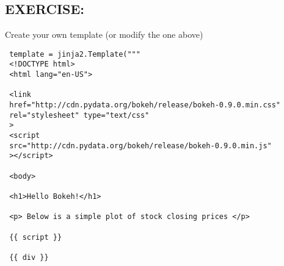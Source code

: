 \documentclass[a4paper,12pt]{article}
\begin{document}
\subsection{EXERCISE: } Create your own template (or modify the one above) 

\begin{framed}
 \begin{verbatim}
 template = jinja2.Template("""
 <!DOCTYPE html>
 <html lang="en-US">
 
 <link
 href="http://cdn.pydata.org/bokeh/release/bokeh-0.9.0.min.css"
 rel="stylesheet" type="text/css"
 >
 <script 
 src="http://cdn.pydata.org/bokeh/release/bokeh-0.9.0.min.js"
 ></script>
 
 <body>
 
 <h1>Hello Bokeh!</h1>
 
 <p> Below is a simple plot of stock closing prices </p>
 
 {{ script }}
 
 {{ div }}
\end{verbatim}
\end{framed}
%
%
%
%
%
\end{document}

